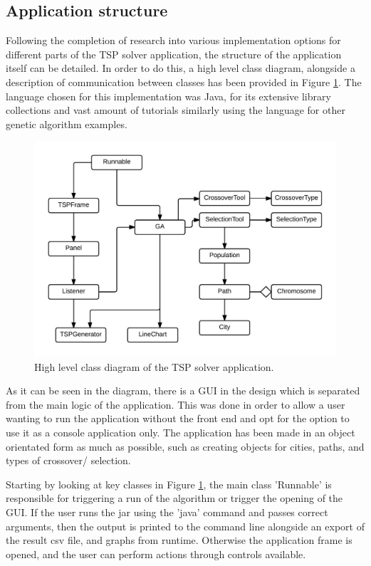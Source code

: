 \documentclass[article]{IEEEtran}
\begin{document}
\subsection{Application structure}
Following the completion of research into various implementation options for different parts of the TSP solver application, the structure of the application itself can be detailed. In order to do this, a high level class diagram, alongside a description of communication between classes has been provided in Figure \ref{fig:5}. The language chosen for this implementation was Java, for its extensive library collections and vast amount of tutorials similarly using the language for other genetic algorithm examples.
\begin{figure}[H]
\centering
\includegraphics[width=.8\linewidth]{images/class}
\caption{High level class diagram of the TSP solver application.}
\label{fig:5}
\end{figure}
As it can be seen in the diagram, there is a GUI in the design which is separated from the main logic of the application. This was done in order to allow a user wanting to run the application without the front end and opt for the option to use it as a console application only. The application has been made in an object orientated form as much as possible, such as creating objects for cities, paths, and types of crossover/ selection. \par
Starting by looking at key classes in Figure \ref{fig:5}, the main class 'Runnable' is responsible for triggering a run of the algorithm or trigger the opening of the GUI. If the user runs the jar using the 'java' command and passes correct arguments, then the output is printed to the command line alongside an export of the result csv file, and graphs from runtime. Otherwise the application frame is opened, and the user can perform actions through controls available. \par
\end{document}
